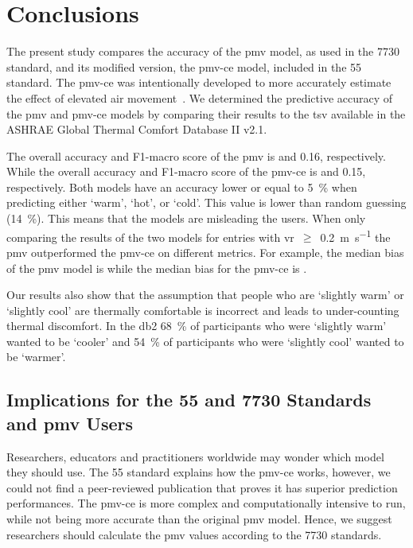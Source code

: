 \section{Conclusions}\label{sec:conclusions}
The present study compares the accuracy of the \ac{pmv} model, as used in the \gls{7730} standard, and its modified version, the \ac{pmv-ce} model, included in the \gls{55} standard.
The \ac{pmv-ce} was intentionally developed to more accurately estimate the effect of elevated air movement~\cite{arens_moving_2009}.
We determined the predictive accuracy of the \ac{pmv} and \ac{pmv-ce} models by comparing their results to the \ac{tsv} available in the ASHRAE Global Thermal Comfort Database II v2.1.

The overall accuracy and F1-macro score of the \ac{pmv} is  and \num{.16}, respectively.
While the overall accuracy and F1-macro score of the \ac{pmv-ce} is  and \num{.15}, respectively.
Both models have an accuracy lower or equal to \qty{5}{\percent} when predicting either `warm', `hot', or `cold'.
This value is lower than random guessing (\qty{14}{\percent}).
This means that the models are misleading the users.
When only comparing the results of the two models for entries with \ac{vr}~$\geq$~\qty{0.2}{\m\per\s} the \ac{pmv} outperformed the \ac{pmv-ce} on different metrics.
For example, the median bias of the \ac{pmv} model is  while the median bias for the \ac{pmv-ce} is .

Our results also show that the assumption that people who are `slightly warm' or `slightly cool' are thermally comfortable is incorrect and leads to under-counting thermal discomfort.
In the \ac{db2} \qty{68}{\percent} of participants who were `slightly warm' wanted to be `cooler' and \qty{54}{\percent} of participants who were `slightly cool' wanted to be `warmer'.

\subsection{Implications for the \gls{55} and \gls{7730} Standards and \ac{pmv} Users}\label{subsec:implications-for-the-ashrae-55-and-iso-7730-standards}
Researchers, educators and practitioners worldwide may wonder which model they should use.
The \gls{55} standard explains how the \ac{pmv-ce} works, however, we could not find a peer-reviewed publication that proves it has superior prediction performances.
The \ac{pmv-ce} is more complex and computationally intensive to run, while not being more accurate than the original \ac{pmv} model.
Hence, we suggest researchers should calculate the \ac{pmv} values according to the \gls{7730} standards.

